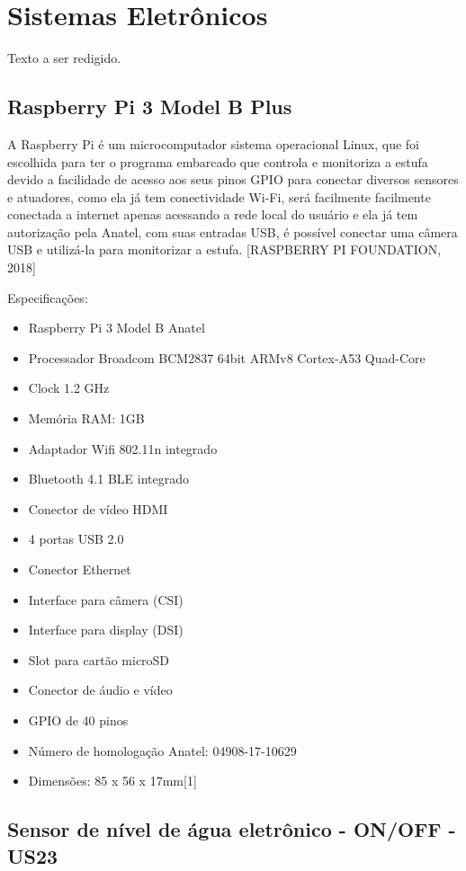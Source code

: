 \section{Sistemas Eletrônicos}
Texto a ser redigido.

\subsection{Raspberry Pi 3 Model B Plus}

A Raspberry Pi é um microcomputador sistema operacional Linux, que foi escolhida para ter o programa embarcado que controla e monitoriza a estufa devido a facilidade de acesso aos seus pinos GPIO para conectar diversos sensores e atuadores, como ela já tem conectividade Wi-Fi, será facilmente facilmente conectada a internet apenas acessando a rede local do usuário e ela já tem autorização pela Anatel, com suas entradas USB, é possível conectar uma câmera USB e utilizá-la para monitorizar a estufa. [RASPBERRY PI FOUNDATION, 2018]

Especificações:

\begin{itemize}
	\item Raspberry Pi 3 Model B Anatel
	\item Processador Broadcom BCM2837 64bit ARMv8 Cortex-A53 Quad-Core
	\item Clock 1.2 GHz
	\item Memória RAM: 1GB
	\item Adaptador Wifi 802.11n integrado
	\item Bluetooth 4.1 BLE integrado
	\item Conector de vídeo HDMI
	\item 4 portas USB 2.0
	\item Conector Ethernet
	\item Interface para câmera (CSI)
	\item Interface para display (DSI)
	\item Slot para cartão microSD
	\item Conector de áudio e vídeo
	\item GPIO de 40 pinos
	\item Número de homologação Anatel: 04908-17-10629 
	\item Dimensões: 85 x 56 x 17mm[1]
\end{itemize}

\subsection{Sensor de nível de água eletrônico - ON/OFF - US23}

